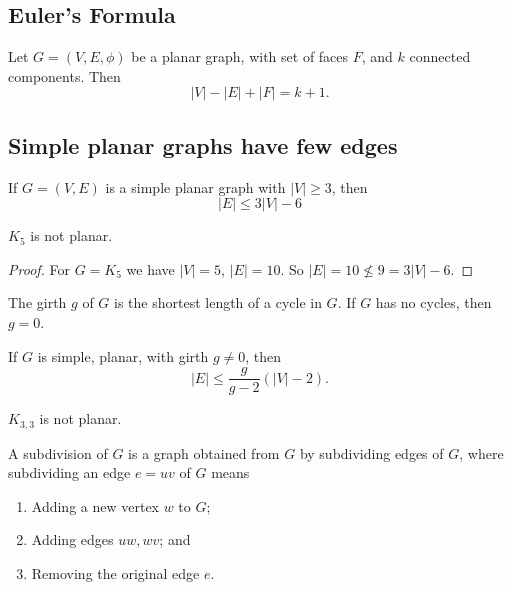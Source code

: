 \documentclass[10pt, a4paper]{article}
\begin{document}
\subsection{Euler's Formula}
\begin{theorem}
    Let $G = (V, E, \phi)$ be a planar graph,
    with set of faces $F$,
    and $k$ connected components.
    Then
    \[
    |V| - |E| + |F| = k + 1.
    \]
\end{theorem}

\subsection{Simple planar graphs have few edges}

\begin{theorem}
    If $G = (V, E)$ is a simple planar graph with $|V| \geq 3$,
    then
    \[
    |E| \leq 3|V| - 6
    \]
\end{theorem}

\begin{corollary}
    $K_5$ is not planar.
    
    \begin{proof}
        For $G = K_5$ we have $|V| = 5$,
        $|E| = 10$.
        So $|E| = 10 \nleq 9 = 3|V| - 6$.
    \end{proof}
\end{corollary}

\begin{definition}
    The girth $g$ of $G$ is the shortest length of a cycle in $G$.
    If $G$ has no cycles,
    then $g = 0$.
\end{definition}

\begin{proposition}
    If $G$ is simple,
    planar,
    with girth $g \neq 0$,
    then
    \[
    |E| \leq \frac{g}{g - 2}(|V| - 2).
    \]
\end{proposition}

\begin{corollary}
    $K_{3, 3}$ is not planar.
\end{corollary}

\begin{definition}
    A subdivision of $G$ is a graph obtained from $G$ by subdividing edges of $G$,
    where subdividing an edge $e = uv$ of $G$ means
    \begin{enumerate}[label = \arabic*.]
        \item Adding a new vertex $w$ to $G$;
        
        \item Adding edges $uw, wv$;
        and

        \item Removing the original edge $e$.
    \end{enumerate}
\end{definition}
\end{document}
